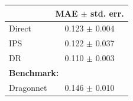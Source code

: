 \begin{tabular}{p{3cm} c} 
\toprule
 & MAE $\pm$ std. err. \\
\midrule
Direct & 0.123 $\pm$ 0.004 \\
IPS & 0.122 $\pm$ 0.037 \\
DR &  0.110 $\bm\pm$ 0.003 \\
\midrule 
\multicolumn{2}{l}{\textbf{Benchmark:}} \\
Dragonnet \citep{shi2019adapting} & \multirow{2}{*}{0.146 $\pm$ 0.010} \\
\bottomrule
\end{tabular}
